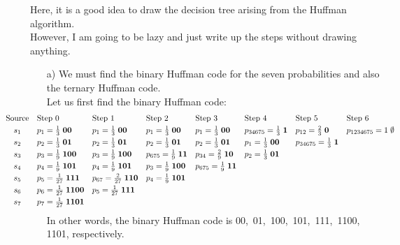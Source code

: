 \documentclass[11pt]{article}
\begin{document}
\bigskip
{} Here, it is a good idea to draw the decision tree arising from the Huffman algorithm.\\
  However, I am going to be lazy and just write up the steps without drawing anything.
\begin{itemize}
  \item[{a)}] We must find the binary Huffman code for the seven probabilities and also the ternary Huffman code.\\
    Let us first find the binary Huffman code:
     \[\hspace*{-20mm}\begin{array}{cllllllll}
  \text{Source} & \text{Step 0}                     & \text{Step 1}                        & \text{Step 2}                      & \text{Step 3}                      & \text{Step 4}                        & \text{Step 5}                       & \text{Step 6}\\[1mm]
         s_1    & p_1 = \frac{1}{ 3}\;\mathbf{ 00}  & p_1    = \frac{1}{ 3}\;\mathbf{ 00}  & p_1    = \frac{1}{3}\;\mathbf{00}  & p_1     = \frac{1}{3}\;\mathbf{00} & p_{34675} = \frac{1}{3}\;\mathbf{1}  & p_{12}    = \frac{2}{3}\;\mathbf{0} & p_{1234675} = 1\;\mathbf{\emptyset}\\[1mm]
         s_2    & p_2 = \frac{1}{ 3}\;\mathbf{ 01}  & p_2    = \frac{1}{ 3}\;\mathbf{ 01}  & p_2    = \frac{1}{3}\;\mathbf{01}  & p_2     = \frac{1}{3}\;\mathbf{01} & p_1       = \frac{1}{3}\;\mathbf{00} & p_{34675} = \frac{1}{3}\;\mathbf{1}\\[1mm]
         s_3    & p_3 = \frac{1}{ 9}\;\mathbf{100}  & p_3    = \frac{1}{ 9}\;\mathbf{100}  & p_{675}= \frac{1}{9}\;\mathbf{11}  & p_{34}  = \frac{2}{9}\;\mathbf{10} & p_2       = \frac{1}{3}\;\mathbf{01}\\[1mm]
         s_4    & p_4 = \frac{1}{ 9}\;\mathbf{101}  & p_4    = \frac{1}{ 9}\;\mathbf{101}  & p_3    = \frac{1}{9}\;\mathbf{100} & p_{675} = \frac{1}{9}\;\mathbf{11}\\[1mm]
         s_5    & p_5 = \frac{1}{27}\;\mathbf{111}  & p_{67} = \frac{2}{27}\;\mathbf{110}  & p_4    = \frac{1}{9}\;\mathbf{101}\\[1mm]
         s_6    & p_6 = \frac{1}{27}\;\mathbf{1100} & p_5    = \frac{1}{27}\;\mathbf{111} \\[1mm]
         s_7    & p_7 = \frac{1}{27}\;\mathbf{1101}
     \end{array}\]
     In other words, the binary Huffman code is 00,\, 01,\, 100,\, 101,\, 111,\, 1100,\, 1101, respectively.\\

\end{itemize}
\end{document}
